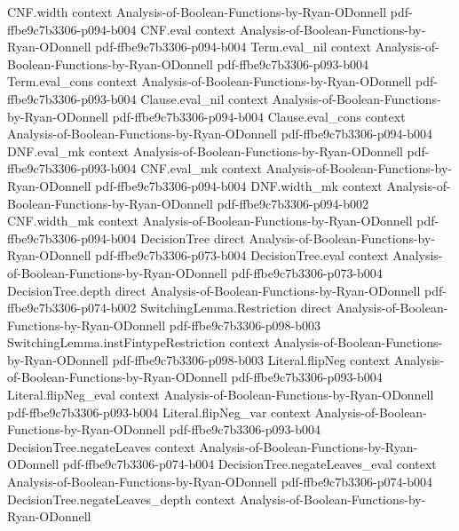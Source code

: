 \begin{lemma}
  {CNF.width}
  {context}
  {Analysis-of-Boolean-Functions-by-Ryan-ODonnell}
  {pdf-ffbe9c7b3306-p094-b004}
\proofstep
  {CNF.eval}
  {context}
  {Analysis-of-Boolean-Functions-by-Ryan-ODonnell}
  {pdf-ffbe9c7b3306-p094-b004}
\proofstep
  {Term.eval_nil}
  {context}
  {Analysis-of-Boolean-Functions-by-Ryan-ODonnell}
  {pdf-ffbe9c7b3306-p093-b004}
\proofstep
  {Term.eval_cons}
  {context}
  {Analysis-of-Boolean-Functions-by-Ryan-ODonnell}
  {pdf-ffbe9c7b3306-p093-b004}
\proofstep
  {Clause.eval_nil}
  {context}
  {Analysis-of-Boolean-Functions-by-Ryan-ODonnell}
  {pdf-ffbe9c7b3306-p094-b004}
\proofstep
  {Clause.eval_cons}
  {context}
  {Analysis-of-Boolean-Functions-by-Ryan-ODonnell}
  {pdf-ffbe9c7b3306-p094-b004}
\proofstep
  {DNF.eval_mk}
  {context}
  {Analysis-of-Boolean-Functions-by-Ryan-ODonnell}
  {pdf-ffbe9c7b3306-p093-b004}
\proofstep
  {CNF.eval_mk}
  {context}
  {Analysis-of-Boolean-Functions-by-Ryan-ODonnell}
  {pdf-ffbe9c7b3306-p094-b004}
\proofstep
  {DNF.width_mk}
  {context}
  {Analysis-of-Boolean-Functions-by-Ryan-ODonnell}
  {pdf-ffbe9c7b3306-p094-b002}
\proofstep
  {CNF.width_mk}
  {context}
  {Analysis-of-Boolean-Functions-by-Ryan-ODonnell}
  {pdf-ffbe9c7b3306-p094-b004}
\proofstep
  {DecisionTree}
  {direct}
  {Analysis-of-Boolean-Functions-by-Ryan-ODonnell}
  {pdf-ffbe9c7b3306-p073-b004}
\proofstep
  {DecisionTree.eval}
  {context}
  {Analysis-of-Boolean-Functions-by-Ryan-ODonnell}
  {pdf-ffbe9c7b3306-p073-b004}
\proofstep
  {DecisionTree.depth}
  {direct}
  {Analysis-of-Boolean-Functions-by-Ryan-ODonnell}
  {pdf-ffbe9c7b3306-p074-b002}
\proofstep
  {SwitchingLemma.Restriction}
  {direct}
  {Analysis-of-Boolean-Functions-by-Ryan-ODonnell}
  {pdf-ffbe9c7b3306-p098-b003}
\proofstep
  {SwitchingLemma.instFintypeRestriction}
  {context}
  {Analysis-of-Boolean-Functions-by-Ryan-ODonnell}
  {pdf-ffbe9c7b3306-p098-b003}
\proofstep
  {Literal.flipNeg}
  {context}
  {Analysis-of-Boolean-Functions-by-Ryan-ODonnell}
  {pdf-ffbe9c7b3306-p093-b004}
\proofstep
  {Literal.flipNeg_eval}
  {context}
  {Analysis-of-Boolean-Functions-by-Ryan-ODonnell}
  {pdf-ffbe9c7b3306-p093-b004}
\proofstep
  {Literal.flipNeg_var}
  {context}
  {Analysis-of-Boolean-Functions-by-Ryan-ODonnell}
  {pdf-ffbe9c7b3306-p093-b004}
\proofstep
  {DecisionTree.negateLeaves}
  {context}
  {Analysis-of-Boolean-Functions-by-Ryan-ODonnell}
  {pdf-ffbe9c7b3306-p074-b004}
\proofstep
  {DecisionTree.negateLeaves_eval}
  {context}
  {Analysis-of-Boolean-Functions-by-Ryan-ODonnell}
  {pdf-ffbe9c7b3306-p074-b004}
\proofstep
  {DecisionTree.negateLeaves_depth}
  {context}
  {Analysis-of-Boolean-Functions-by-Ryan-ODonnell}

\end{lemma}
